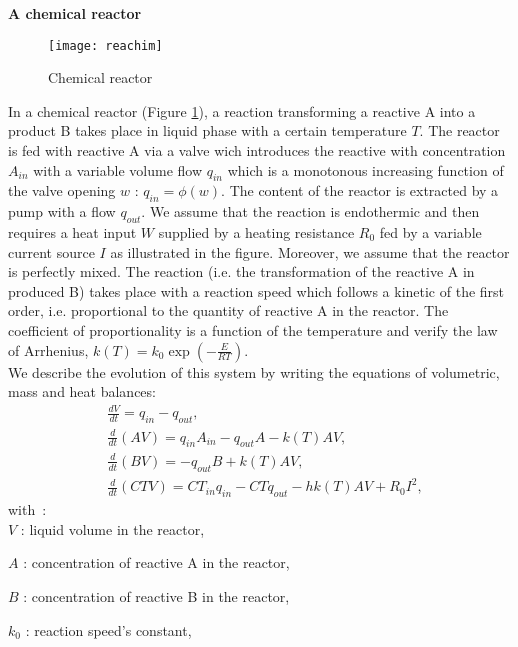 \begin{exemple}{\bf  A chemical reactor }

\begin{figure}[ht]
\begin{center}
\texttt{[image: reachim]}
\caption{Chemical reactor}
\label{fig:reachim}
\end{center}
\end{figure}
In a chemical reactor (Figure \ref{fig:reachim}), a reaction transforming a reactive A into a product B takes place in liquid phase with a certain temperature  $T$.  The reactor is fed with reactive
A via a valve wich introduces the reactive with concentration
$A_{in}$ with a variable volume flow
$q_{in}$ which is a monotonous increasing function of the valve opening $w$ : $q_{in} = \phi(w)$. The content of the reactor is extracted by a pump with a flow $q_{out}$. We assume that the reaction is endothermic and then requires a heat input $W$ supplied by a heating resistance $R_0$ fed by a variable current source $I$ as illustrated in the figure. Moreover, we assume that the reactor is
perfectly mixed. The reaction (i.e. the transformation of the reactive A in
produced B) takes place with a reaction speed which follows a kinetic of the first order, i.e. proportional to the quantity of reactive A in the
reactor. The coefficient of proportionality is a function of the temperature
and verify the law of Arrhenius, $k(T)=k_0 \exp(-\frac{E}{RT})$.\\

We describe the evolution of this system by writing the equations of volumetric, mass and heat balances:
\begin{equation*} \begin{split} 
&\frac{dV}{dt} = q_{in} - q_{out},\\[0.3em]
&\frac{d}{dt}(AV) = q_{in}A_{in} -q_{out}A-k(T)AV, \\[0.3em]
&\frac{d}{dt}(BV) = -q_{out}B + k(T)AV, \\[0.3em]
&\frac{d}{dt}(CTV) = CT_{in}q_{in}-CTq_{out} - hk(T)AV + R_0I^2,
\end{split} \end{equation*}
with~:\\

$V$ : liquid volume in the reactor, 

$A$ : concentration of reactive A in the reactor,

$B$ : concentration of reactive B in the reactor,

$k_0$ : reaction speed's constant,


\end{exemple}
